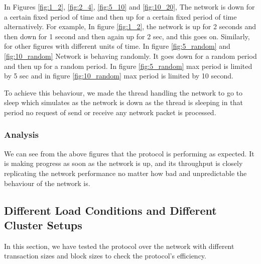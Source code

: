 In Figures \ref{fig:1_2}, \ref{fig:2_4}, \ref{fig:5_10} and \ref{fig:10_20}, The network is down for a certain fixed period of time and then up for a certain fixed period of time alternatively. For example, In figure \ref{fig:1_2}, the network is up for 2 seconds and then down for 1 second and then again up for 2 sec, and this goes on. Similarly, for other figures with different units of time. In figure \ref{fig:5_random} and \ref{fig:10_random} Network is behaving randomly. It goes down for a random period and then up for a random period.
In figure \ref{fig:5_random} max period is limited by 5 sec and in figure \ref{fig:10_random} max period is limited by 10 second.

To achieve this behaviour, we made the thread handling the network to go to sleep which simulates as the network is down as the thread is sleeping in that period no request of send or receive any network packet is processed.

\subsubsection{Analysis}
We can see from the above figures that the protocol is performing as expected. It is making progress as soon as the network is up, and its throughput is closely replicating the network performance no matter how bad and unpredictable the behaviour of the network is.
\subsection{Different Load Conditions and Different Cluster Setups}
In this section, we have tested the protocol over the network with different transaction sizes and block sizes to check the protocol's efficiency.

